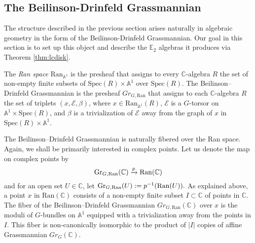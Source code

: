 \begin{comment}
\begin{rmk}
In fact, this theorem will be logically unnecessary for what follows and we include it only for completeness.  As such, we omit the definition of the term \emph{constructible cosheaf}.  
\end{rmk}

We summarize the preceding discussion by drawing the following corollary of Theorem~\ref{thm:lcdisk}:
\begin{cor} \label{cor:E2crit}
Let $\C$ be a symmetric monoidal $\infty$-category and $A \in \C$ be a $\mathrm{Fact}(\mathbb{C})$ algebra.  Suppose that $A$ has the property that for any inclusion $D\subset D' \subset \mathbb{C}$ of disks, the natural map $A(\mathrm{Ran}(D))\to A(\mathrm{Ran}(D'))$ is an equivalence.  Then, for any disk $D\subset \mathbb{C}$, $A(\mathrm{Ran}(D))$ inherits the structure of a non-unital $\mathbb{E}_2$-algebra in $\C$.  
\end{cor}
\end{comment}


\subsection{The Beilinson-Drinfeld Grassmannian}
The structure described in the previous section arises naturally in algebraic geometry in the form of the Beilinson-Drinfeld Grassmannian.  Our goal in this section is to set up this object and describe the $\mathbb{E}_2$ algebras it produces via Theorem \ref{thm:lcdisk}.

\begin{dfn}
The \textit{Ran space} $\text{Ran}_{\mathbb{A}^1}$ is the presheaf that assigns to every $\mathbb{C}$-algebra $R$ the set of non-empty finite subsets of $\text{Spec}(R) \times \mathbb{A}^1$ over $\text{Spec}(R)$.   The Beilinson--Drinfeld Grassmannian is the presheaf $Gr_{G,\text{Ran}}$ that assigns to each $\mathbb{C}$-algebra $R$ the set of triplets $(x,\mathcal{E},\beta)$, where $x \in \text{Ran}_{\mathbb{A}^1}(R)$, $\mathcal{E}$ is a $G$-torsor on $\mathbb{A}^1 \times \text{Spec}(R)$, and $\beta$ is a trivialization of $\mathcal{E}$ away from the graph of $x$ in $\text{Spec}(R) \times \mathbb{A}^1$.
\end{dfn}

The Beilinson--Drinfeld Grassmannian is naturally fibered over the Ran space.  Again, we shall be primarily interested in complex points.  Let us denote the map on complex points by $$\operatorname{\mathrm{Gr}}_{G,\operatorname{\mathrm{Ran}}}(\mathbb{C}) \xrightarrow{p} \operatorname{\mathrm{Ran}}(\mathbb{C})$$ and for an open set $U\in \mathbb{C}$, let $\operatorname{\mathrm{Gr}}_{G,\operatorname{\mathrm{Ran}}}(U):= p^{-1}(\operatorname{\mathrm{Ran}}(U)).$   As explained above, a point $x$ in $\text{Ran}(\mathbb{C})$ consists of a non-empty finite subset $I \subset \mathbb{C}$ of points in $\mathbb{C}$.  The fiber of the Beilinson--Drinfeld Grassmannian $Gr_{G,\text{Ran}}(\mathbb{C})$ over $x$ is the moduli of $G$-bundles on $\mathbb{A}^1$ equipped with a trivialization away from the points in $I$.  This fiber is non-canonically isomorphic to the product of $|I|$ copies of affine Grassmannian $Gr_G(\mathbb{C})$.  

